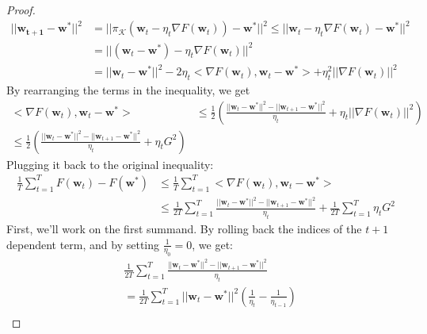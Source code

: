 \begin{proof}
    \begin{equation*}
        \begin{split}            
            ||\pmb{w_{t+1} - \pmb{w}^*}||^2 
            &= ||\pi_{\mathcal{K}}(\pmb{w}_t - \eta_t \nabla F(\pmb{w}_t)) - \pmb{w}^*||^2
            \leq ||\pmb{w}_t - \eta_t \nabla F(\pmb{w}_t) - \pmb{w}^*||^2 \\
            &= ||(\pmb{w}_t - \pmb{w}^*) - \eta_t \nabla F(\pmb{w}_t)||^2 \\
            &= ||\pmb{w}_t - \pmb{w}^*||^2 - 2\eta_t <\nabla F(\pmb{w}_t), \pmb{w}_t - \pmb{w}^*> + \eta_t^2 ||\nabla F(\pmb{w}_t)||^2
        \end{split}
    \end{equation*}
    By rearranging the terms in the inequality, we get
    \begin{equation*}
        \begin{split}            
            <\nabla F(\pmb{w}_t), \pmb{w}_t - \pmb{w}^*> &\leq \frac{1}{2} \left(\frac{||\pmb{w}_t - \pmb{w}^*||^2 - ||\pmb{w}_{t+1} - \pmb{w}^*||^2}{\eta_t} + \eta_t ||\nabla F(\pmb{w}_t)||^2\right) \\
            \leq \frac{1}{2} \left(\frac{||\pmb{w}_t - \pmb{w}^*||^2 - ||\pmb{w}_{t+1} - \pmb{w}^*||^2}{\eta_t} + \eta_t G^2\right)
        \end{split}
    \end{equation*}
    Plugging it back to the original inequality:
    \begin{equation*}
        \begin{split}            
            \frac{1}{T} \sum_{t=1}^T F(\pmb{w}_t) - F(\pmb{w}^*) 
            &\leq \frac{1}{T} \sum_{t=1}^T <\nabla F(\pmb{w}_t), \pmb{w}_t - \pmb{w}^*> \\
            &\leq \frac{1}{2T} \sum_{t=1}^T \frac{||\pmb{w}_t - \pmb{w}^*||^2 - ||\pmb{w}_{t+1} - \pmb{w}^*||^2}{\eta_t} + \frac{1}{2T} \sum_{t=1}^T \eta_t G^2
        \end{split}
    \end{equation*}
    First, we'll work on the first summand. By rolling back the indices of the $t+1$ dependent term, and by setting $\frac{1}{\eta_0} = 0$, we get:
    \begin{equation*}
        \begin{split}
            &\frac{1}{2T} \sum_{t=1}^T \frac{||\pmb{w}_t - \pmb{w}^*||^2 - ||\pmb{w}_{t+1} - \pmb{w}^*||^2}{\eta_t} \\
            &= \frac{1}{2T} \sum_{t=1}^T ||\pmb{w}_t - \pmb{w}^*||^2 \left(\frac{1}{\eta_t} - \frac{1}{\eta_{t-1}}\right) \\

\end{split}
\end{equation*}
\end{proof}
